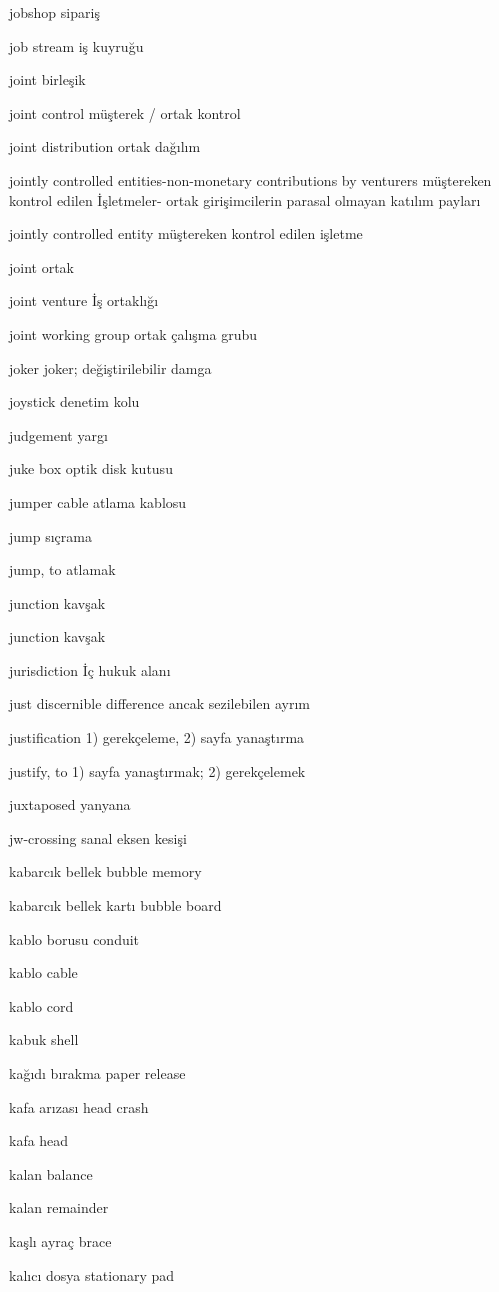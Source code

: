 \documentclass[12pt,fleqn]{article}\usepackage{../../common}
\begin{document}
jobshop sipariş

job stream iş kuyruğu

joint birleşik

joint control müşterek / ortak kontrol

joint distribution ortak dağılım

jointly controlled entities-non-monetary contributions by venturers müştereken kontrol edilen İşletmeler- ortak girişimcilerin parasal olmayan katılım payları 

jointly controlled entity müştereken kontrol edilen işletme

joint ortak

joint venture İş ortaklığı

joint working group ortak çalışma grubu

joker joker; değiştirilebilir damga

joystick denetim kolu

judgement yargı

juke box optik disk kutusu

jumper cable atlama kablosu

jump sıçrama

jump, to atlamak

junction kavşak

junction kavşak

jurisdiction İç hukuk alanı

just discernible difference ancak sezilebilen ayrım

justification 1) gerekçeleme, 2) sayfa yanaştırma

justify, to 1) sayfa yanaştırmak; 2) gerekçelemek

juxtaposed yanyana

jw-crossing sanal eksen kesişi

kabarcık bellek bubble memory

kabarcık bellek kartı bubble board

kablo borusu conduit

kablo cable

kablo cord

kabuk shell

kağıdı bırakma paper release

kafa arızası head crash

kafa head

kalan balance

kalan remainder

kaşlı ayraç brace

kalıcı dosya stationary pad
\end{document}
